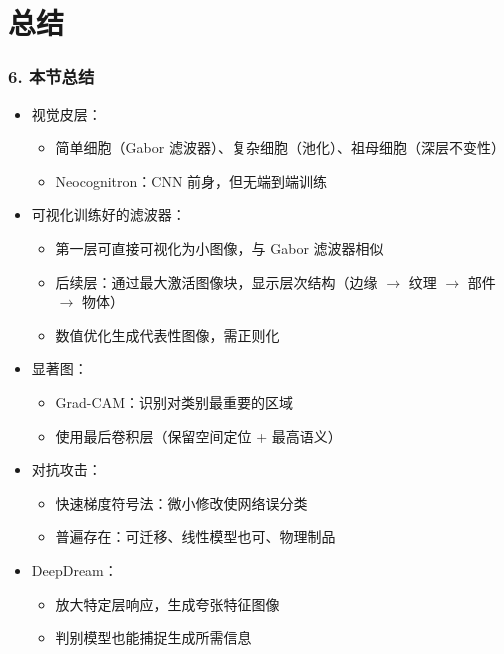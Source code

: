 \documentclass[t,aspectratio=169]{beamer} %
\begin{document}
\section{总结}

\begin{frame}
    \frametitle{6. 本节总结}
    \begin{itemize}
        \item \alert{视觉皮层}：
        \begin{itemize}
            \item 简单细胞（Gabor 滤波器）、复杂细胞（池化）、祖母细胞（深层不变性）
            \item Neocognitron：CNN 前身，但无端到端训练
        \end{itemize}
        \item \alert{可视化训练好的滤波器}：
        \begin{itemize}
            \item 第一层可直接可视化为小图像，与 Gabor 滤波器相似
            \item 后续层：通过最大激活图像块，显示层次结构（边缘 $\to$ 纹理 $\to$ 部件 $\to$ 物体）
            \item 数值优化生成代表性图像，需正则化
        \end{itemize}
        \item \alert{显著图}：
        \begin{itemize}
            \item Grad-CAM：识别对类别最重要的区域
            \item 使用最后卷积层（保留空间定位 + 最高语义）
        \end{itemize}
        \item \alert{对抗攻击}：
        \begin{itemize}
            \item 快速梯度符号法：微小修改使网络误分类
            \item 普遍存在：可迁移、线性模型也可、物理制品
        \end{itemize}
        \item \alert{DeepDream}：
        \begin{itemize}
            \item 放大特定层响应，生成夸张特征图像
            \item 判别模型也能捕捉生成所需信息
        \end{itemize}
    \end{itemize}
\end{frame}
\end{document}
